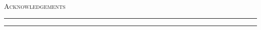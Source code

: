 \null
\vfill

\begin{center}

{\LARGE{\scshape Acknowledgements}}\\

\noindent\rule[2pt]{0.85\textwidth}{0.5pt}

\parbox{0.85\textwidth}{
\blindtext







}

\noindent\rule[2pt]{0.85\textwidth}{0.5pt}

\end{center}

\vfill

\cleardoublepage
